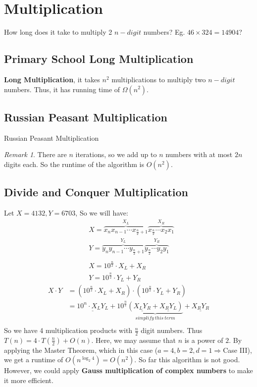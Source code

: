 \documentclass[11pt, a4paper, oneside]{book}
\DeclarePairedDelimiter\floor{\lfloor}{\rfloor}
\theoremstyle{theoremdd}
\theoremstyle{remark}
\newtheorem*{remark}{Remark}
\begin{document}
\section{Multiplication}
How long does it take to multiply 2 $n-digit$ numbers? Eg. $46 \times 324 = 14904$? 

\subsection{Primary School Long Multiplication}
\textbf{Long Multiplication}, it takes \textbf{$n^2$} multiplications to multiply two $n-digit$ numbers. Thus, it has running time of $\Omega (n^2)$.

\subsection{Russian Peasant Multiplication}
\begin{algorithm}[H]
\SetAlgoLined
{}
\caption{Russian Peasant Multiplication}
\end{algorithm}
\begin{remark}
There are $n$ iterations, so we add up to $n$ numbers with at most $2n$ digits each. So the runtime of the algorithm is $O(n^2)$.
\end{remark}

\subsection{Divide and Conquer Multiplication}
Let $X = 4132, Y=6703$, So we will have: 
\begin{align*}
&X = \overbrace{x_{n}x_{n-1}\cdots x_{\frac{n}{2}+1}}^{X_{L}}\overbrace{x_{\frac{n}{2}}\cdots x_{2}x_{1}}^{X_{R}} \\ &
Y = \overbrace{y_{n}y_{n-1}\cdots y_{\frac{n}{2}+1}}^{Y_{L}}\overbrace{y_{\frac{n}{2}}\cdots y_{2}y_{1}}^{Y_{R}} \\ &
\\&
X = 10^{\frac{n}{2}}\cdot X_{L} + X_{R} \\&
Y = 10^{\frac{n}{2}}\cdot Y_{L} + Y_{R}
\end{align*}
\begin{align*}
X\cdot Y & = (10^{\frac{n}{2}}\cdot X_{L} + X_{R})\cdot(10^{\frac{n}{2}}\cdot Y_{L} + Y_{R}) \\&
		   = \underline{10^{n} \cdot X_{L}Y_{L}} + 10^{\frac{n}{2}}\underbrace{(\underline{X_{L}Y_{R}} + \underline{X_{R}Y_{L}})}_{simplify \ this \ term} + \underline{X_{R}Y_{R}} \\
\end{align*}
So we have 4 multiplication products with $\frac{n}{2}$ digit numbers. Thus $T(n) = 4\cdot T(\frac{n}{2}) + O(n)$. Here, we may assume that $n$ is a power of $2$. By applying the Master Theorem, which in this case ($a=4, b=2, d=1 \Rightarrow $Case III), we get a runtime of $O(n^{\log_{2} 4}) = O(n^2)$. So far this algorithm is not good. However, we could apply \textbf{Gauss multiplication of complex numbers} to make it more efficient. 
\end{document}
